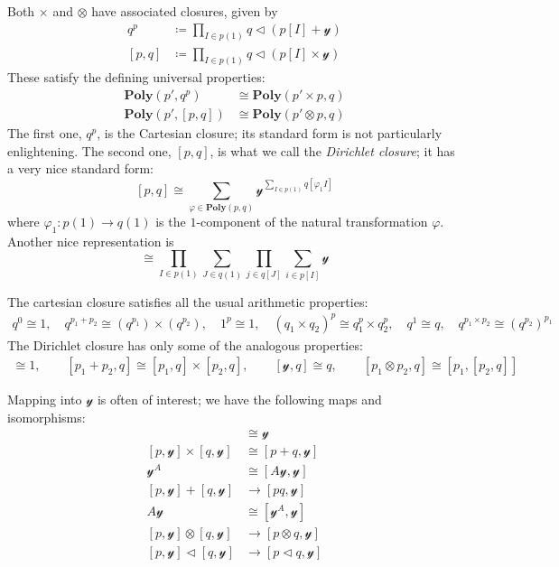 \documentclass[11pt, one side, article]{memoir}
\theoremstyle{definition}
\theoremstyle{plain}
\newcommand{\Cat}[1]{\mathbf{#1}}%
\newcommand{\yon}{\mathcal{y}}
\newcommand{\poly}{\Cat{Poly}}
\newcommand{\0}{\textsf{0}}
\newcommand{\1}{\tn{\textsf{1}}}
\newcommand{\tri}{\mathbin{\triangleleft}}
\begin{document}
Both $\times$ and $\otimes$ have associated closures, given by
\begin{align}
  q^p&\coloneqq \prod_{I\in p(1)}q\tri(p[I]+\yon)\label{eqn.cart_cl}\\
  [p,q]&\coloneqq\prod_{I\in p(1)}q\tri(p[I]\times\yon)
\end{align}
These satisfy the defining universal properties:
\begin{align}
  \poly(p',q^p)&\cong\poly(p'\times p,q)\\
  \poly(p',[p,q])&\cong\poly(p'\otimes p,q)
\end{align}
The first one, $q^p$, is the Cartesian closure; its standard form is not particularly enlightening. The second one, $[p,q]$, is what we call the \emph{Dirichlet closure}; it has a very nice standard form:
\[
[p,q]\cong\sum_{\varphi\in\poly(p,q)}\yon^{\sum\limits_{I\in p(1)}q[\varphi_1I]}
\]
where $\varphi_1\colon p(1)\to q(1)$ is the $1$-component of the natural transformation $\varphi$. Another nice representation is
\begin{equation}
[p,q]\cong\prod_{I\in p(1)}\sum_{J\in q(1)}\prod_{j\in q[J]}\sum_{i\in p[I]}\yon
\end{equation}

The cartesian closure satisfies all the usual arithmetic properties:
\begin{gather}
	q^0\cong1,\quad
	q^{p_1+p_2}\cong (q^{p_1})\times(q^{p_2}),\quad
	1^p\cong 1,\quad
	(q_1\times q_2)^p\cong q_1^p\times q_2^p,\quad
	q^1\cong q,\quad
	q^{p_1\times p_2}\cong (q^{p_2})^{p_1}
\end{gather}
The Dirichlet closure has only some of the analogous properties:
\begin{gather}
	[0,p]\cong1,\qquad
	[p_1+p_2,q]\cong [p_1,q]\times[p_2,q],\qquad
	[\yon,q]\cong q,\qquad
	[p_1\otimes p_2,q]\cong[p_1,[p_2,q]]
\end{gather}

Mapping into $\yon$ is often of interest; we have the following maps and isomorphisms:
\begin{align}
	[\yon,\yon]&\cong\yon\\
  [p,\yon]\times[q,\yon]&\cong[p+q,\yon]\\
  \yon^A&\cong[A\yon,\yon]\\
  [p,\yon]+[q,\yon]&\to[pq,\yon]\\
  A\yon&\cong[\yon^A,\yon]\\
	[p,\yon]\otimes[q,\yon]&\to[p\otimes q,\yon]\\
	[p,\yon]\tri[q,\yon]&\to[p\tri q,\yon]
\end{align}
\end{document}
